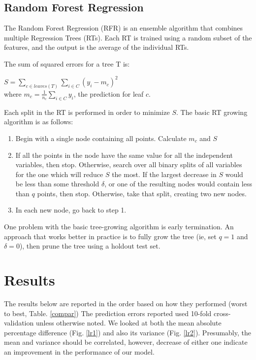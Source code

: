 \documentclass[conference]{IEEEtran}
\begin{document}
\subsection{Random Forest Regression}
The Random Forest Regression (RFR) is an ensemble algorithm that combines multiple Regression Trees (RTs). Each RT is trained using a random subset of the features, and the output is the average of the individual RTs. 

The sum of squared errors for a tree T is:

$ \displaystyle S = \sum_{c \in leaves(T)}\sum_{i \in C}(y_{i}-m_{c})^{2}$ \\
where $\displaystyle m_{c} = \frac{1}{n_{c}}\sum_{i \in C}y_{i}$, the prediction for leaf $c$.

Each split in the RT is performed in order to minimize $S$. The basic RT growing algorithm is as follows:

\begin{enumerate}
\item Begin with a single node containing all points. Calculate $m_{c}$ and $S$
\item If all the points in the node have the same value for all the independent variables, then stop. Otherwise, search over all binary splits of all variables for the one which will reduce $S$ the most. If the largest decrease in
$S$ would be less than some threshold $\delta$, or one of the resulting nodes would
contain less than $q$ points, then stop. Otherwise, take that split, creating two new nodes.
\item In each new node, go back to step 1.
\end{enumerate}

One problem with the basic tree-growing algorithm is early termination. An approach that works better in practice is to fully grow the tree (ie, set $q=1$ and $\delta=0$), then prune the tree using a holdout test set.

\section{Results}

The results below are reported in the order based on how they performed (worst to best, Table. \ref{compar}) The prediction errors reported used 10-fold cross-validation unless otherwise noted. We looked at both the mean absolute percentage difference (Fig. \ref{lr1}) and also its variance (Fig. \ref{lr2}). Presumably, the mean and variance should be correlated, however, decrease of either one indicate an improvement in the performance of our model.
\end{document}

